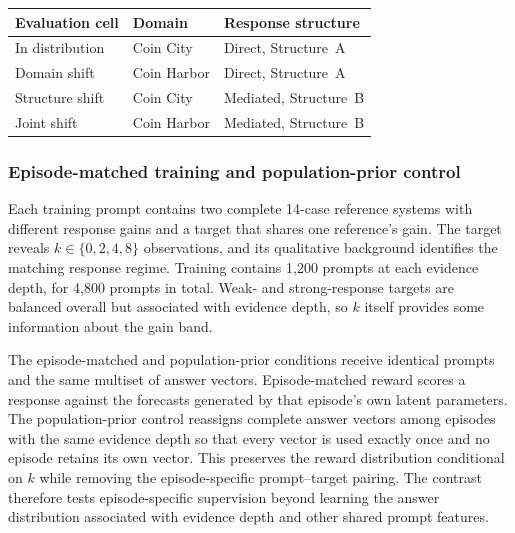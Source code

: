 \begin{center}
\begin{minipage}{0.90\linewidth}
\centering
{}
\label{tab:exp3-domain-contrast}
\small
\begin{tabular}{lll}
\toprule
Evaluation cell & Domain & Response structure \\
\midrule
In distribution & Coin City & Direct, Structure~A \\
Domain shift & Coin Harbor & Direct, Structure~A \\
Structure shift & Coin City & Mediated, Structure~B \\
Joint shift & Coin Harbor & Mediated, Structure~B \\
\bottomrule
\end{tabular}
\end{minipage}
\end{center}

\subsubsection{Episode-matched training and population-prior control}

Each training prompt contains two complete 14-case reference systems with different response gains and a target that shares one reference's gain.
The target reveals \(k\in\{0,2,4,8\}\) observations, and its qualitative background identifies the matching response regime.
Training contains 1,200 prompts at each evidence depth, for 4,800 prompts in total.
Weak- and strong-response targets are balanced overall but associated with evidence depth, so \(k\) itself provides some information about the gain band.

The episode-matched and population-prior conditions receive identical prompts and the same multiset of answer vectors.
Episode-matched reward scores a response against the forecasts generated by that episode's own latent parameters.
The population-prior control reassigns complete answer vectors among episodes with the same evidence depth so that every vector is used exactly once and no episode retains its own vector.
This preserves the reward distribution conditional on \(k\) while removing the episode-specific prompt--target pairing.
The contrast therefore tests episode-specific supervision beyond learning the answer distribution associated with evidence depth and other shared prompt features.

